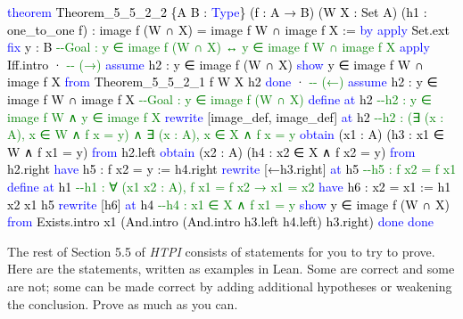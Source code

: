 \documentclass[
  letterpaper,
  DIV=11,
  numbers=noendperiod]{scrreprt}
\newenvironment{Shaded}{\begin{snugshade}}{\end{snugshade}}
\newcommand{\CommentTok}[1]{\textcolor[rgb]{0.37,0.37,0.37}{#1}}
\newcommand{\KeywordTok}[1]{\textcolor[rgb]{0.00,0.23,0.31}{#1}}
\newcommand{\NormalTok}[1]{\textcolor[rgb]{0.00,0.23,0.31}{#1}}
\renewcommand{\NormalTok}[1]{\textcolor[HTML]{000000}{#1}}
\renewcommand{\KeywordTok}[1]{\textcolor[HTML]{0000FF}{#1}}
\renewcommand{\CommentTok}[1]{\textcolor[HTML]{008000}{#1}}
\theoremstyle{remark}
\begin{document}
\begin{Shaded}
\begin{Highlighting}[]
\KeywordTok{theorem}\NormalTok{ Theorem\_5\_5\_2\_2 \{A B : }\KeywordTok{Type}\NormalTok{\} (f : A → B) (W X : Set A)}
\NormalTok{    (h1 : one\_to\_one f) : image f (W ∩ X) = image f W ∩ image f X := }\KeywordTok{by}
  \KeywordTok{apply}\NormalTok{ Set.ext}
  \KeywordTok{fix}\NormalTok{ y : B      }\CommentTok{{-}{-}Goal : y ∈ image f (W ∩ X) ↔ y ∈ image f W ∩ image f X}
  \KeywordTok{apply}\NormalTok{ Iff.intro}
\NormalTok{  · }\CommentTok{{-}{-} (→)}
    \KeywordTok{assume}\NormalTok{ h2 : y ∈ image f (W ∩ X)}
    \KeywordTok{show}\NormalTok{ y ∈ image f W ∩ image f X }\KeywordTok{from}\NormalTok{ Theorem\_5\_5\_2\_1 f W X h2}
    \KeywordTok{done}
\NormalTok{  · }\CommentTok{{-}{-} (←)}
    \KeywordTok{assume}\NormalTok{ h2 : y ∈ image f W ∩ image f X  }\CommentTok{{-}{-}Goal : y ∈ image f (W ∩ X)}
    \KeywordTok{define} \KeywordTok{at}\NormalTok{ h2                  }\CommentTok{{-}{-}h2 : y ∈ image f W ∧ y ∈ image f X}
    \KeywordTok{rewrite}\NormalTok{ [image\_def, image\_def] }\KeywordTok{at}\NormalTok{ h2}
          \CommentTok{{-}{-}h2 : (∃ (x : A), x ∈ W ∧ f x = y) ∧ ∃ (x : A), x ∈ X ∧ f x = y}
    \KeywordTok{obtain}\NormalTok{ (x1 : A) (h3 : x1 ∈ W ∧ f x1 = y) }\KeywordTok{from}\NormalTok{ h2.left}
    \KeywordTok{obtain}\NormalTok{ (x2 : A) (h4 : x2 ∈ X ∧ f x2 = y) }\KeywordTok{from}\NormalTok{ h2.right}
    \KeywordTok{have}\NormalTok{ h5 : f x2 = y := h4.right}
    \KeywordTok{rewrite}\NormalTok{ [←h3.right] }\KeywordTok{at}\NormalTok{ h5  }\CommentTok{{-}{-}h5 : f x2 = f x1}
    \KeywordTok{define} \KeywordTok{at}\NormalTok{ h1               }\CommentTok{{-}{-}h1 : ∀ (x1 x2 : A), f x1 = f x2 → x1 = x2}
    \KeywordTok{have}\NormalTok{ h6 : x2 = x1 := h1 x2 x1 h5}
    \KeywordTok{rewrite}\NormalTok{ [h6] }\KeywordTok{at}\NormalTok{ h4           }\CommentTok{{-}{-}h4 : x1 ∈ X ∧ f x1 = y}
    \KeywordTok{show}\NormalTok{ y ∈ image f (W ∩ X) }\KeywordTok{from}
\NormalTok{      Exists.intro x1 (And.intro (And.intro h3.left h4.left) h3.right)}
    \KeywordTok{done}
  \KeywordTok{done}
\end{Highlighting}
\end{Shaded}

The rest of Section 5.5 of \emph{HTPI} consists of statements for you to
try to prove. Here are the statements, written as examples in Lean. Some
are correct and some are not; some can be made correct by adding
additional hypotheses or weakening the conclusion. Prove as much as you
can.
\end{document}
